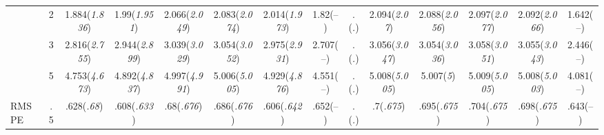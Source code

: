 \documentclass{article}
\begin{document}
\begin{table}[tbp]
{\begin{tabularx}{\textwidth}{lCCCCCCCCCCCCC}
&2&1.884\newline (\emph{1.836})&1.99\newline (\emph{1.951})&2.066\newline (\emph{2.049})&2.083\newline (\emph{2.074})&2.014\newline (\emph{1.973})&1.82\newline (--)&.\newline (\emph{.})&2.094\newline (\emph{2.07})&2.088\newline (\emph{2.056})&2.097\newline (\emph{2.077})&2.092\newline (\emph{2.066})&1.642\newline (--) \tabularnewline
&3&2.816\newline (\emph{2.755})&2.944\newline (\emph{2.899})&3.039\newline (\emph{3.029})&3.054\newline (\emph{3.052})&2.975\newline (\emph{2.931})&2.707\newline (--)&.\newline (\emph{.})&3.056\newline (\emph{3.047})&3.054\newline (\emph{3.036})&3.058\newline (\emph{3.051})&3.055\newline (\emph{3.043})&2.446\newline (--) \tabularnewline
&5&4.753\newline (\emph{4.673})&4.892\newline (\emph{4.837})&4.997\newline (\emph{4.991})&5.006\newline (\emph{5.005})&4.929\newline (\emph{4.876})&4.551\newline (--)&.\newline (\emph{.})&5.008\newline (\emph{5.005})&5.007\newline (\emph{5})&5.009\newline (\emph{5.005})&5.008\newline (\emph{5.003})&4.081\newline (--) \tabularnewline
\midrule RMSPE&.5&.628\newline (\emph{.68})&.608\newline (\emph{.633})&.68\newline (\emph{.676})&.686\newline (\emph{.676})&.606\newline (\emph{.642})&.652\newline (--)&.\newline (\emph{.})&.7\newline (\emph{.675})&.695\newline (\emph{.675})&.704\newline (\emph{.675})&.698\newline (\emph{.675})&.643\newline (--) \tabularnewline

\end{tabularx}}
\end{table}
\end{document}
